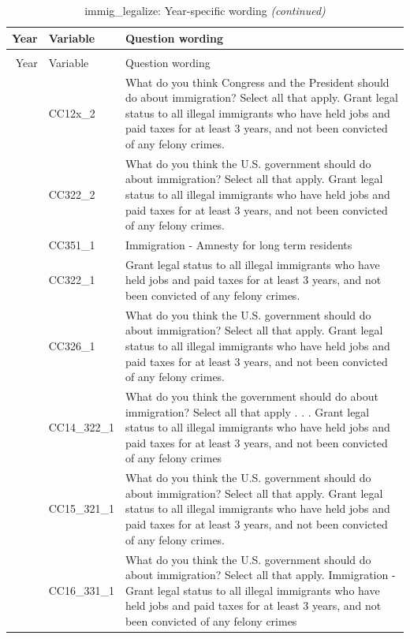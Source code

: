 \documentclass[
  12pt]{article}
\begin{document}
\begin{longtable}[t]{rl>{\raggedright\arraybackslash}p{10cm}}
\caption{\label{tab:unnamed-chunk-5}immig\_legalize: Year-specific wording}\\
\toprule
Year & Variable & Question wording\\
\midrule
\endfirsthead
\caption[]{immig\_legalize: Year-specific wording \textit{(continued)}}\\
\toprule
Year & Variable & Question wording\\
\midrule
\endhead

\endfoot
\bottomrule
\endlastfoot
2007 & CC12x\_2 & What do you think Congress and the President should do about immigration? Select all that apply. Grant legal status to all illegal immigrants who have held jobs and paid taxes for at least 3 years, and not been convicted of any felony crimes.\\
\addlinespace
2010 & CC322\_2 & What do you think the U.S. government should do about immigration? Select all that apply. Grant legal status to all illegal immigrants who have held jobs and paid taxes for at least 3 years, and not been convicted of any felony crimes.\\
\addlinespace
2011 & CC351\_1 & Immigration - Amnesty for long term residents\\
\addlinespace
2012 & CC322\_1 & Grant legal status to all illegal immigrants who have held jobs and paid taxes for at least 3 years, and not been convicted of any felony crimes.\\
\addlinespace
2013 & CC326\_1 & What do you think the U.S. government should do about immigration? Select all that apply. Grant legal status to all illegal immigrants who have held jobs and paid taxes for at least 3 years, and not been convicted of any felony crimes.\\
\addlinespace
2014 & CC14\_322\_1 & What do you think the government should do about immigration? Select all that apply . . . Grant legal status to all illegal immigrants who have held jobs and paid taxes for at least 3 years, and not been convicted of any felony crimes\\
\addlinespace
2015 & CC15\_321\_1 & What do you think the U.S. government should do about immigration? Select all that apply. Grant legal status to all illegal immigrants who have held jobs and paid taxes for at least 3 years, and not been convicted of any felony crimes.\\
\addlinespace
2016 & CC16\_331\_1 & What do you think the U.S. government should do about immigration? Select all that apply. Immigration - Grant legal status to all illegal immigrants who have held jobs and paid taxes for at least 3 years, and not been convicted of any felony crimes\\

\end{longtable}
\end{document}
